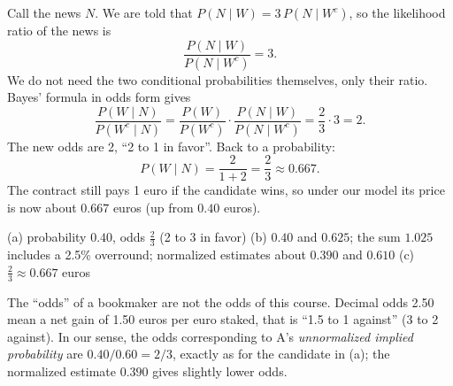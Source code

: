 \begin{solution}
	 Call the news $N$. We are told that
	$P(N\mid W)=3\,P(N\mid W^c)$, so the likelihood ratio of the news is
	\[ \frac{P(N\mid W)}{P(N\mid W^c)}=3. \]
	We do not need the two conditional probabilities themselves, only their
	ratio. Bayes' formula in odds form gives
	\[ \frac{P(W\mid N)}{P(W^c\mid N)}=\frac{P(W)}{P(W^c)}\cdot
		\frac{P(N\mid W)}{P(N\mid W^c)}=\frac23\cdot 3=2. \]
	The new odds are 2, ``2 to 1 in favor''. Back to a probability:
	\[ P(W\mid N)=\frac{2}{1+2}=\frac23\approx 0.667. \]
	The contract still pays 1 euro if the candidate wins, so under our model
	its price is now about $0.667$ euros (up from $0.40$ euros).
	\begin{answer}
		(a) probability $0.40$, odds $\frac23$ (2 to 3 in favor) \quad
		(b) $0.40$ and $0.625$; the sum $1.025$ includes a 2.5\% overround;
		normalized estimates about $0.390$ and $0.610$ \quad
		(c) $\frac23\approx 0.667$ euros
	\end{answer}
	\begin{remark}
		The ``odds'' of a bookmaker are not the odds of this course. Decimal odds
		2.50 mean a net gain of 1.50 euros per euro staked, that is ``1.5 to 1
		against'' (3 to 2 against). In our sense, the odds corresponding to
		A's \emph{unnormalized implied probability} are $0.40/0.60=2/3$,
		exactly as for the candidate in (a); the normalized estimate $0.390$
		gives slightly lower odds.
	\end{remark}
\end{solution}
